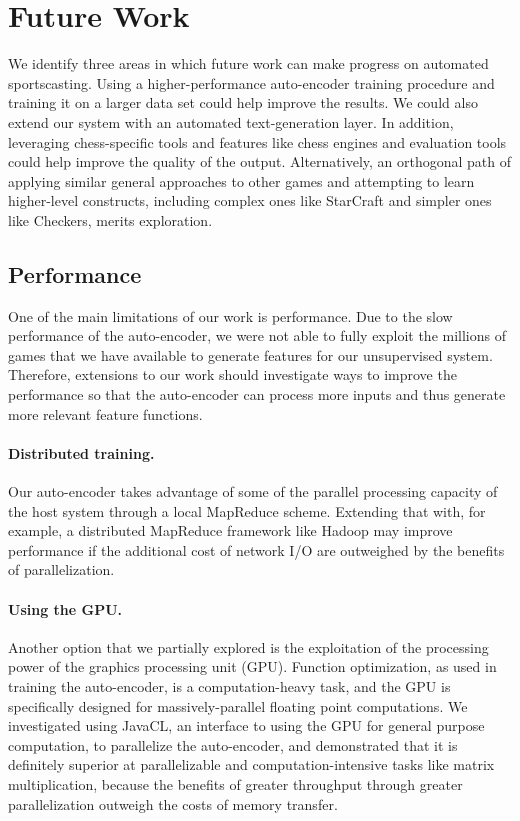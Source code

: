 \documentclass[11pt]{article}
\begin{document}
\section{Future Work}
We identify three areas in which future work can make progress on 
automated sportscasting. Using a higher-performance auto-encoder 
training procedure and training it on a larger data set could help 
improve the results. We could also extend our system with an automated 
text-generation layer. In addition, leveraging chess-specific tools and 
features like chess engines and evaluation tools could help improve the 
quality of the output. Alternatively, an orthogonal path of applying 
similar general approaches to other games and attempting to learn 
higher-level constructs, including complex ones like StarCraft and 
simpler ones like Checkers, merits exploration.

\subsection{Performance}
One of the main limitations of our work is performance. Due to the slow 
performance of the auto-encoder, we were not able to fully exploit the 
millions of games that we have available to generate features for our 
unsupervised system. Therefore, extensions to our work should 
investigate ways to improve the performance so that the auto-encoder can 
process more inputs and thus generate more relevant feature functions.

\paragraph{Distributed training.}
Our auto-encoder takes advantage of some of the parallel processing 
capacity of the host system through a local MapReduce scheme. Extending 
that with, for example, a distributed MapReduce framework like Hadoop 
may improve performance if the additional cost of network I/O are 
outweighed by the benefits of parallelization.

\paragraph{Using the GPU.}
Another option that we partially explored is the exploitation of the 
processing power of the graphics processing unit (GPU). Function 
optimization, as used in training the auto-encoder, is a 
computation-heavy task, and the GPU is specifically designed for 
massively-parallel floating point computations. We investigated using 
JavaCL, an interface to using the GPU for general purpose computation, 
to parallelize the auto-encoder, and demonstrated that it is definitely 
superior at parallelizable and computation-intensive tasks like matrix 
multiplication, because the benefits of greater throughput through 
greater parallelization outweigh the costs of memory transfer.
\end{document}
